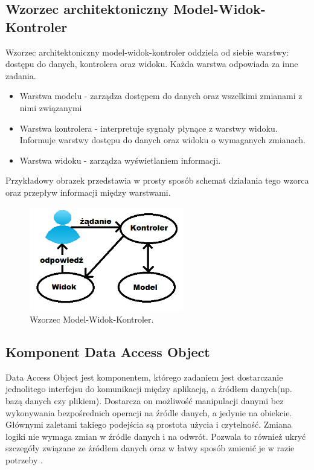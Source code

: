 \documentclass[12pt]{report}
\begin{document}
\subsection{Wzorzec architektoniczny Model-Widok-Kontroler}
	\indent Wzorzec architektoniczny model-widok-kontroler oddziela od siebie warstwy: do\-stępu do danych, kontrolera oraz widoku. Każda warstwa odpowiada za inne zadania.
	\begin{itemize}
	\item Warstwa modelu - zarządza dostępem do danych oraz wszelkimi zmianami z nimi związanymi
	\item Warstwa kontrolera - interpretuje sygnały płynące z warstwy widoku. Informuje warstwy dostępu do danych oraz widoku o wymaganych zmianach.
	\item Warstwa widoku - zarządza wyświetlaniem informacji. 
	\end{itemize}
Przykładowy obrazek przedstawia w prosty sposób schemat działania tego wzorca oraz przepływ informacji między warstwami. \\
\begin{figure}[h]
	\centering
	\includegraphics[width=0.6\textwidth]{images/mvc.png}
	\caption{Wzorzec Model-Widok-Kontroler.}
\end{figure}
\FloatBarrier
\subsection{Komponent Data Access Object}
	\indent Data Access Object jest komponentem, którego zadaniem jest dostarczanie jednolitego interfejsu do komunikacji między aplikacją, a źródłem danych(np. bazą danych czy plikiem). Dostarcza on możliwość manipulacji danymi bez wykonywania bezpośrednich operacji na źródle danych, a jedynie na obiekcie. Głównymi zaletami takiego podejścia są prostota użycia i czytelność. Zmiana logiki nie wymaga zmian w źródle danych i na odwrót. Pozwala to również ukryć szczegóły związane ze źródłem danych oraz w łatwy sposób zmienić je w razie potrzeby \cite{dao}.
\end{document}
